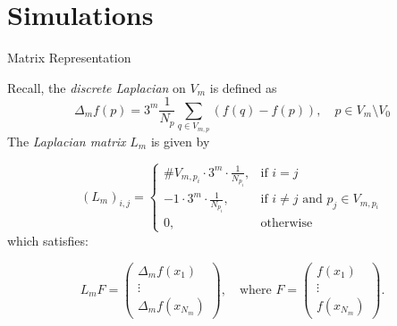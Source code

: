 \documentclass{beamer}
\newcommand{\cd}{\cdot}
\begin{document}
\section{Simulations}
\begin{frame}{Matrix Representation}
	
	\vspace{2.5em}
	Recall, the \emph{discrete Laplacian} on $V_m$ is defined as
	\vspace{-0.5em}
	\begin{equation}
		\Delta_m f(p) = 3^{m} \frac{1}{N_p}\sum_{q \in V_{m,p}} (f(q) - f(p)), \quad p \in V_m \setminus V_0
	\end{equation}
	\pause
The \emph{Laplacian matrix} $L_m$ is given by 

\vspace{-1em}
	\begin{equation}
		(L_m)_{i,j} = \begin{cases}
			\#V_{m,p_i} \cd 3^{m} \cd\frac{1}{N_{p_i}}, & \text{if } i= j \\
			-1 \cd 3^{m} \cd \frac{1}{N_{p_i}}, & \text{if } i \neq j \text{ and } p_j \in V_{m,p_i} \\
			0, & \text{otherwise}
		\end{cases}
	\end{equation}
	which satisfies:
	
	\vspace{-1.5em}
	\begin{equation}
		L_mF = \begin{pmatrix}
			\Delta_m f(x_1)\\
			\vdots \\
			\Delta_{m}f(x_{N_m})
		\end{pmatrix}, \quad \text{where } F = \begin{pmatrix}
			f(x_1)\\
			\vdots \\
			f(x_{N_m})
		\end{pmatrix}.
	\end{equation} 
\end{frame}
\end{document}
